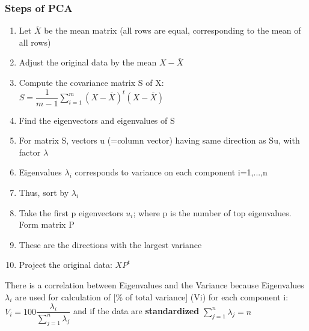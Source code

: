 \subsubsection{Steps of PCA}
\begin{enumerate}
    \item Let $\overline{X} $ be the mean matrix (all rows are equal, corresponding to the mean of all rows)
    \item Adjust the original data by the mean $X-\overline{X}$
    \item Compute the covariance matrix S of X: $ S = \dfrac{1}{m-1} \sum\limits_{i=1}^m (X - \overline{X})^t (X - \overline{X})$
    \item Find the eigenvectors and eigenvalues of S
    \item For matrix S, vectors u (=column vector) having same direction as Su, with factor $\lambda$
    \item Eigenvalues $\lambda_i$ corresponds to variance on each component i=1,...,n
    \item Thus, sort by $\lambda_i$
    \item Take the first p eigenvectors $u_i$; where p is the number of top eigenvalues. Form matrix P
    \item These are the directions with the largest variance
    \item Project the original data: $XP^t$
\end{enumerate}

There is a correlation between Eigenvalues and the Variance because Eigenvalues $\lambda_i$ are used for calculation of [\% of total variance] (Vi) for each component i: $ V_i = 100 \dfrac{\lambda_i}{\sum\limits_{j=1}^n \lambda_j} $ and if the data are \textbf{standardized} $\sum\limits_{j=1}^n \lambda_j = n $

